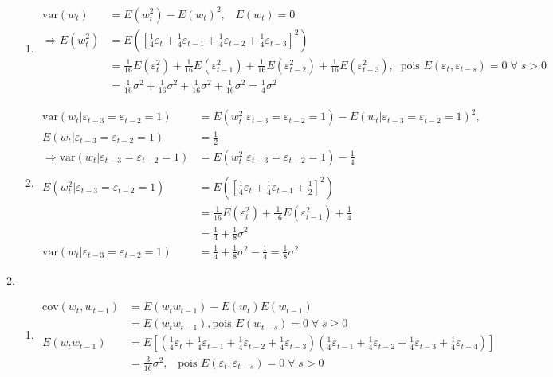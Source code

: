 \begin{enumerate}
\begin{enumerate}
			\begin{enumerate}
				\item 
				\begin{align*}
					\text{var}(w_t)&=E(w_t^2)-E(w_t)^2, \;\;\; E(w_t)=0\\
					\Rightarrow E(w_t^2)&=E([\frac{1}{4}\varepsilon_{t}+\frac{1}{4}\varepsilon_{t-1}+\frac{1}{4}\varepsilon_{t-2}+\frac{1}{4}\varepsilon_{t-3}]^2)\\
				&=\frac{1}{16}E(\varepsilon_{t}^2)+\frac{1}{16}E(\varepsilon_{t-1}^2)+\frac{1}{16}E(\varepsilon_{t-2}^2)+\frac{1}{16}E(\varepsilon_{t-3}^2), \;\; \text{pois } E(\varepsilon_{t},\varepsilon_{t-s})=0\; \forall \;s>0\\
				&=\frac{1}{16}\sigma^2+\frac{1}{16}\sigma^2+\frac{1}{16}\sigma^2+\frac{1}{16}\sigma^2=\frac{1}{4}\sigma^2
				\end{align*}		
				\item
				\begin{align*}
				\text{var}(w_t|\varepsilon_{t-3}=\varepsilon_{t-2}=1)&=E(w_t^2|\varepsilon_{t-3}=\varepsilon_{t-2}=1)-E(w_t|\varepsilon_{t-3}=\varepsilon_{t-2}=1)^2,\\
				E(w_t|\varepsilon_{t-3}=\varepsilon_{t-2}=1)&=\frac{1}{2}\\
				\Rightarrow	\text{var}(w_t|\varepsilon_{t-3}=\varepsilon_{t-2}=1)&=E(w_t^2|\varepsilon_{t-3}=\varepsilon_{t-2}=1)-\frac{1}{4}\\
				\\
				E(w_t^2|\varepsilon_{t-3}=\varepsilon_{t-2}=1)&=E([\frac{1}{4}\varepsilon_{t}+\frac{1}{4}\varepsilon_{t-1}+\frac{1}{2}]^2)\\
				&=\frac{1}{16}E(\varepsilon_t^2)+\frac{1}{16}E(\varepsilon_{t-1}^2)+\frac{1}{4}\\
				&=\frac{1}{4}+\frac{1}{8}\sigma^2\\
				\text{var}(w_t|\varepsilon_{t-3}=\varepsilon_{t-2}=1)&=\frac{1}{4}+\frac{1}{8}\sigma^2-\frac{1}{4}=\frac{1}{8}\sigma^2
				\end{align*}		
			\end{enumerate}
			
			\item %
				\begin{enumerate}
					\item 
					\begin{align*}
					\text{cov}(w_t,w_{t-1})&=E(w_tw_{t-1})-E(w_t)E(w_{t-1})\\
					&=E(w_tw_{t-1}), \text{pois } E(w_{t-s})=0\; \forall\; s\geq0\\
					E(w_tw_{t-1})&=E[(\frac{1}{4}\varepsilon_{t}+\frac{1}{4}\varepsilon_{t-1}+\frac{1}{4}\varepsilon_{t-2}+\frac{1}{4}\varepsilon_{t-3})(\frac{1}{4}\varepsilon_{t-1}+\frac{1}{4}\varepsilon_{t-2}+\frac{1}{4}\varepsilon_{t-3}+\frac{1}{4}\varepsilon_{t-4})]\\
					&=\frac{3}{16}\sigma^2, \;\;\;\text{pois } E(\varepsilon_{t},\varepsilon_{t-s})=0\; \forall \;s>0
					\end{align*}
					

\end{enumerate}
\end{enumerate}
\end{enumerate}
